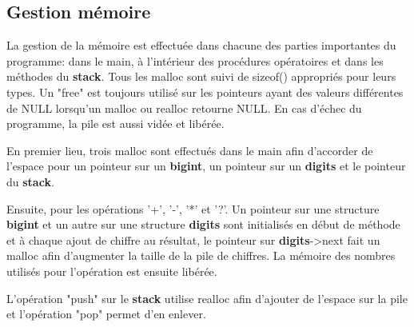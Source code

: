 \documentclass[]{report}
\begin{document}
\newpage
	\begin{normalsize}
		\section*{\LARGE Gestion mémoire}\vspace{4mm}
		La gestion de la mémoire est effectuée dans chacune des parties importantes du programme: dans le main, à l'intérieur des procédures opératoires et dans les méthodes du \textbf{stack}. Tous les malloc sont suivi de sizeof() appropriés pour leurs types. Un "free" est toujours utilisé sur les pointeurs ayant des valeurs différentes de NULL lorsqu'un malloc ou realloc retourne NULL. En cas d'échec du programme, la pile est aussi vidée et libérée.
		\vspace{4mm}
		\par En premier lieu, trois malloc sont effectués dans le main afin d'accorder de l'espace pour un pointeur sur un \textbf{bigint}, un pointeur sur un \textbf{digits} et le pointeur du \textbf{stack}.
		\vspace{4mm}
		\par Ensuite, pour les opérations '+', '-', '*' et '?'. Un pointeur sur une structure \textbf{bigint} et un autre sur une structure \textbf{digits} sont initialisés en début de méthode et à chaque ajout de chiffre au résultat, le pointeur sur \textbf{digits}-\textgreater next fait un malloc afin d'augmenter la taille de la pile de chiffres. La mémoire des nombres utilisés pour l'opération est ensuite libérée.\vspace{4mm}
		\par L'opération "push" sur le \textbf{stack} utilise realloc afin d'ajouter de l'espace sur la pile et l'opération "pop" permet d'en enlever.
		\vspace{4mm}
	\end{normalsize}
\end{document}
